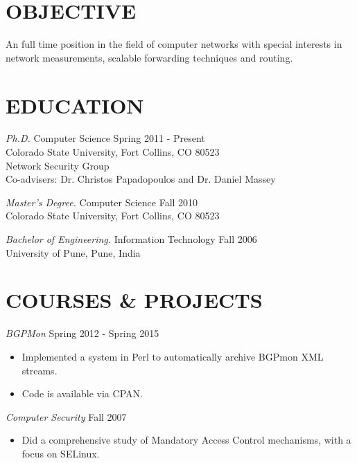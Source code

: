 \documentclass[line,margin]{res}
\begin{document}
\address{1775 Milmont Dr. Apt. N205 Milpitas CA 95035}
\address{Email: kaustubh.gadkari@gmail.com \\
Phone: +1-970-261-1699}


\begin{resume}

\section{OBJECTIVE}
 An full time position in the field of computer networks with special
               interests in network measurements, scalable forwarding
               techniques and routing.


\section{EDUCATION}
                {\sl Ph.D.} Computer Science \hfill Spring 2011 - Present\\
                    Colorado State University, Fort Collins, CO 80523\\
                    Network Security Group\\
                    Co-advisers: Dr. Christos Papadopoulos and Dr. Daniel Massey

                {\sl Master's Degree.} Computer Science \hfill Fall 2010\\
                    Colorado State University, Fort Collins, CO 80523

                {\sl Bachelor of Engineering.} Information Technology \hfill Fall 2006\\
                	  University of Pune, Pune, India

\section{COURSES \& PROJECTS}
					{\sl BGPMon} \hfill Spring 2012 - Spring 2015
				\begin{itemize} \itemsep -2pt
							\item Implemented a system in Perl to automatically archive BGPmon XML streams.
							\item Code is available via CPAN.
						\end{itemize}

					{\sl Computer Security} \hfill Fall 2007
						\begin{itemize} \itemsep -2pt
						\item Did a comprehensive study of Mandatory Access Control mechanisms, with a focus on SELinux.
						\end{itemize}


\end{resume}
\end{document}
